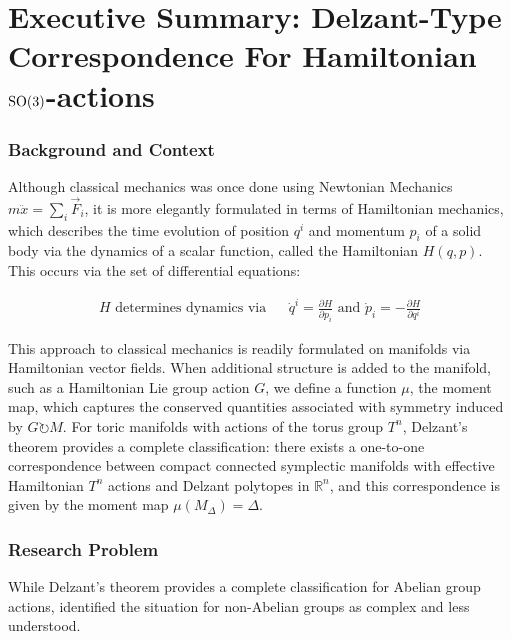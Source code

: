 \section*{Executive Summary: Delzant-Type Correspondence For Hamiltonian $\rm{SO}(3)$-actions}
\subsubsection*{Background and Context}
\noindent Although classical mechanics was once done using Newtonian Mechanics $m \ddot{x} = \sum_{i} \vec{F}_{i}$, it is more elegantly formulated in terms of Hamiltonian mechanics, which describes the time evolution of position $q^{i}$ and momentum $p_{i}$ of a solid body via the dynamics of a scalar function, called the Hamiltonian $H(q,p)$. This occurs via the set of differential equations: 

\begin{align}
H \text{ determines dynamics via} && \dot{q}^{i} = \frac{\partial H}{\partial p_{i}} \text{ and } \dot{p}_{i} = -\frac{\partial H}{\partial q^{i}}
\tag{Hamilton's Equations}
\end{align}

\noindent This approach to classical mechanics is readily formulated on manifolds via Hamiltonian vector fields. When additional structure is added to the manifold, such as a Hamiltonian Lie group action $G$, we define a function $\mu$, the moment map, which captures the conserved quantities associated with symmetry induced by $G \circlearrowright M$. 
\noindent For toric manifolds with actions of the torus group $T^n$, Delzant's theorem provides a complete classification: there exists a one-to-one correspondence between compact connected symplectic manifolds with effective Hamiltonian $T^n$ actions and Delzant polytopes in $\mathbb{R}^n$, and this correspondence is given by the moment map $\mu(M_{\Delta}) = \Delta$.
\subsubsection*{Research Problem}
\noindent While Delzant's theorem provides a complete classification for Abelian group actions, \textcite{Guillemin1994} identified the situation for non-Abelian groups as complex and less understood.
